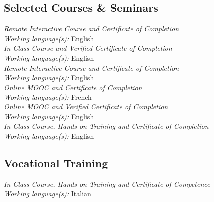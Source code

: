 \documentclass[
  a4paper, 
]{fortysecondscv}
\begin{document}
\subsection{Selected Courses \& Seminars}
\begin{cvtable}
		{{\small\emph{\small Remote Interactive Course and Certificate of Completion}\\\textit{\small Working language(s):} English}\\[-0.8em]}
		{{\small\emph{\small In-Class Course and Verified Certificate of Completion}\\\textit{\small Working language(s):} English}\\[-0.8em]}
		{{\small\emph{\small Remote Interactive Course and Certificate of Completion}\\\textit{\small Working language(s):} English}\\[-0.8em]}
		{{\small\emph{\small Online MOOC and Certificate of Completion}\\\textit{\small Working language(s):} French}\\[-0.8em]}
		{{\small\emph{\small Online MOOC and Verified Certificate of Completion}\\\textit{\small Working language(s):} English}\\[-0.8em]}
		{{\small\emph{\small In-Class Course, Hands-on Training and Certificate of Completion}\\\textit{\small Working language(s):} English}}
\end{cvtable}
\subsection{Vocational Training}
\begin{cvtable}
		{{\small\emph{\small In-Class Course, Hands-on Training and Certificate of Competence}\\\textit{\small Working language(s):} Italian}}
\end{cvtable}
\end{document}
